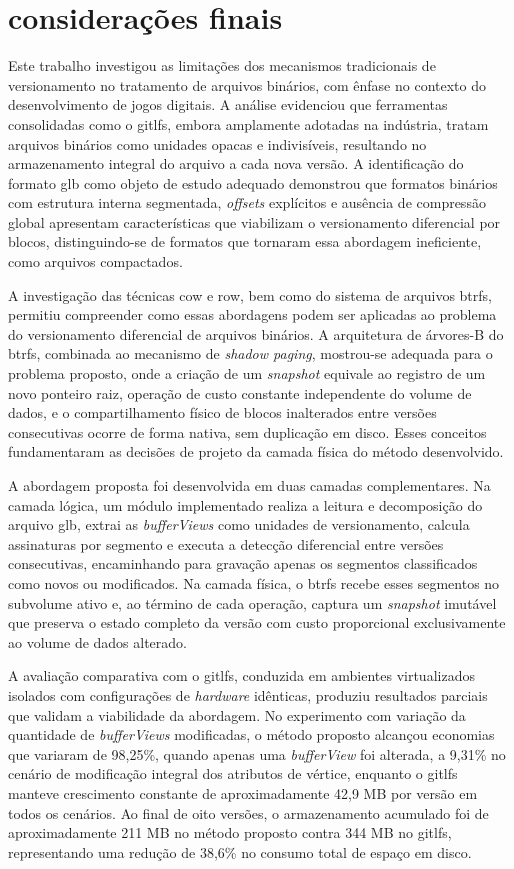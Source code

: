 \chapter{considerações finais}\label{cap:conclusao}

Este trabalho investigou as limitações dos mecanismos tradicionais de versionamento
no tratamento de arquivos binários, com ênfase no contexto do desenvolvimento de
jogos digitais. A análise evidenciou que ferramentas consolidadas como o
\gls{gitlfs}, embora amplamente adotadas na indústria, tratam arquivos binários como
unidades opacas e indivisíveis, resultando no armazenamento integral do arquivo a
cada nova versão. A identificação do formato \gls{glb} como objeto de estudo
adequado demonstrou que formatos binários com estrutura interna segmentada,
\textit{offsets} explícitos e ausência de compressão global apresentam
características que viabilizam o versionamento diferencial por blocos,
distinguindo-se de formatos que tornaram essa abordagem ineficiente, como arquivos
compactados.

A investigação das técnicas \gls{cow} e \gls{row}, bem como do sistema de arquivos
\gls{btrfs}, permitiu compreender como essas abordagens podem ser aplicadas ao
problema do versionamento diferencial de arquivos binários. A arquitetura de
árvores-B do \gls{btrfs}, combinada ao mecanismo de \textit{shadow paging},
mostrou-se adequada para o problema proposto, onde a criação de um
\textit{snapshot} equivale ao registro de um novo ponteiro raiz, operação de custo
constante independente do volume de dados, e o compartilhamento físico de blocos
inalterados entre versões consecutivas ocorre de forma nativa, sem duplicação em
disco. Esses conceitos fundamentaram as decisões de projeto da camada física do
método desenvolvido.

A abordagem proposta foi desenvolvida em duas camadas complementares. Na camada
lógica, um módulo implementado realiza a leitura e decomposição do arquivo
\gls{glb}, extrai as \textit{bufferViews} como unidades de versionamento, calcula
assinaturas por segmento e executa a detecção diferencial entre versões
consecutivas, encaminhando para gravação apenas os segmentos classificados como
novos ou modificados. Na camada física, o \gls{btrfs} recebe esses segmentos no
subvolume ativo e, ao término de cada operação, captura um \textit{snapshot}
imutável que preserva o estado completo da versão com custo proporcional
exclusivamente ao volume de dados alterado.

A avaliação comparativa com o \gls{gitlfs}, conduzida em ambientes virtualizados
isolados com configurações de \textit{hardware} idênticas, produziu resultados
parciais que validam a viabilidade da abordagem. No experimento com variação da
quantidade de \textit{bufferViews} modificadas, o método proposto alcançou economias
que variaram de 98,25\%, quando apenas uma \textit{bufferView} foi alterada, a
9,31\% no cenário de modificação integral dos atributos de vértice, enquanto o
\gls{gitlfs} manteve crescimento constante de aproximadamente 42,9 MB por versão em
todos os cenários. Ao final de oito versões, o armazenamento acumulado foi de
aproximadamente 211 MB no método proposto contra 344 MB no \gls{gitlfs},
representando uma redução de 38,6\% no consumo total de espaço em disco.

